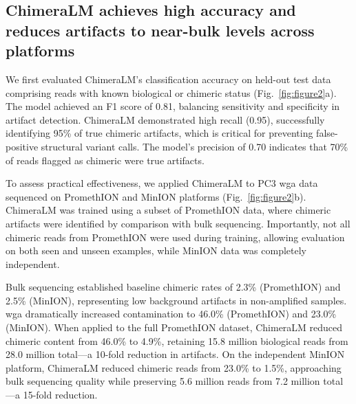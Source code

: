 \documentclass[pdflatex,sn-nature,lineno]{sn-jnl}%
\theoremstyle{thmstyleone}%
\theoremstyle{thmstyletwo}%
\theoremstyle{thmstylethree}%
\begin{document}
\subsection*{ChimeraLM achieves high accuracy and reduces artifacts to near-bulk levels across platforms}

We first evaluated ChimeraLM's classification accuracy on held-out test data comprising reads with known biological or chimeric status (Fig.~\ref{fig:figure2}a).
The model achieved an F1 score of 0.81, balancing sensitivity and specificity in artifact detection.
ChimeraLM demonstrated high recall (0.95), successfully identifying 95\% of true chimeric artifacts, which is critical for preventing false-positive structural variant calls.
The model's precision of 0.70 indicates that 70\% of reads flagged as chimeric were true artifacts.


To assess practical effectiveness, we applied ChimeraLM to PC3 \gls{wga} data sequenced on PromethION and MinION platforms (Fig.~\ref{fig:figure2}b).
ChimeraLM was trained using a subset of PromethION data, where chimeric artifacts were identified by comparison with bulk sequencing.
Importantly, not all chimeric reads from PromethION were used during training, allowing evaluation on both seen and unseen examples, while MinION data was completely independent.

Bulk sequencing established baseline chimeric rates of 2.3\% (PromethION) and 2.5\% (MinION), representing low background artifacts in non-amplified samples. 
\gls{wga} dramatically increased contamination to 46.0\% (PromethION) and 23.0\% (MinION).
When applied to the full PromethION dataset, ChimeraLM reduced chimeric content from 46.0\% to 4.9\%, retaining 15.8 million biological reads from 28.0 million total—a 10-fold reduction in artifacts.
On the independent MinION platform, ChimeraLM reduced chimeric reads from 23.0\% to 1.5\%, approaching bulk sequencing quality while preserving 5.6 million reads from 7.2 million total—a 15-fold reduction.
\end{document}
